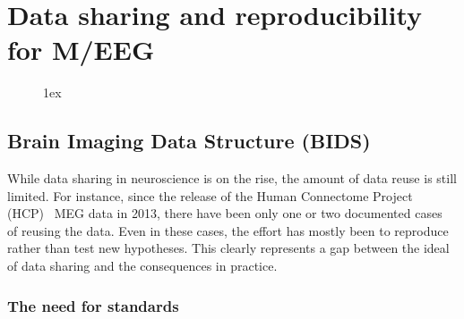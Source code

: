 \chapter{Data sharing and reproducibility for M/EEG}
\label{chapter:group_study}

\begin{figure}[ht!]
\centering
\begingroup
\etocstandardlines
\renewcommand{\etocbelowtocskip}{0pt\relax}
\fboxsep1ex
\localtableofcontents
\endgroup
\end{figure}

\clearpage

\section{Brain Imaging Data Structure (BIDS)}

While data sharing in neuroscience is on the rise, the amount of data reuse is still limited. For instance, since the release of the Human Connectome Project (HCP)~\citep{larson2013adding} MEG data in 2013, there have been only one or two documented cases~\citep{jas2017autoreject} of reusing the data. Even in these cases, the effort has mostly been to reproduce rather than test new hypotheses. This clearly represents a gap between the ideal of data sharing and the consequences in practice. 


\subsection{The need for standards}

